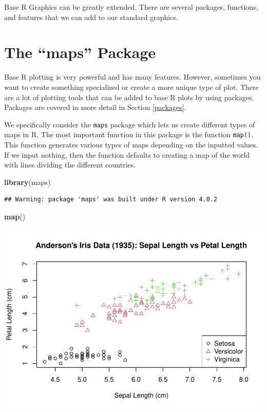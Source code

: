 \documentclass[
]{book}
\newenvironment{Shaded}{\begin{snugshade}}{\end{snugshade}}
\newcommand{\KeywordTok}[1]{\textcolor[rgb]{0.13,0.29,0.53}{\textbf{#1}}}
\newcommand{\NormalTok}[1]{#1}
\begin{document}
Base R Graphics can be greatly extended. There are several packages, functions, and features that we can add to our standard graphics.

\hypertarget{the-maps-package}{%
\section{The ``maps'' Package}\label{the-maps-package}}

Base R plotting is very powerful and has many features. However, sometimes you want to create something specialized or create a more unique type of plot. There are a lot of plotting tools that can be added to base R plots by using packages. Packages are covered in more detail in Section \ref{packages}.

We specifically consider the \texttt{maps} package which lets us create different types of maps in R. The most important function in this package is the function \texttt{map()}. This function generates various types of maps depending on the inputted values. If we input nothing, then the function defaults to creating a map of the world with lines dividing the different countries.

\begin{Shaded}
\begin{Highlighting}[]
\KeywordTok{library}\NormalTok{(maps)}
\end{Highlighting}
\end{Shaded}

\begin{verbatim}
## Warning: package 'maps' was built under R version 4.0.2
\end{verbatim}

\begin{Shaded}
\begin{Highlighting}[]
\KeywordTok{map}\NormalTok{()}
\end{Highlighting}
\end{Shaded}

\includegraphics{_main_files/figure-latex/unnamed-chunk-193-1.pdf}
\end{document}
